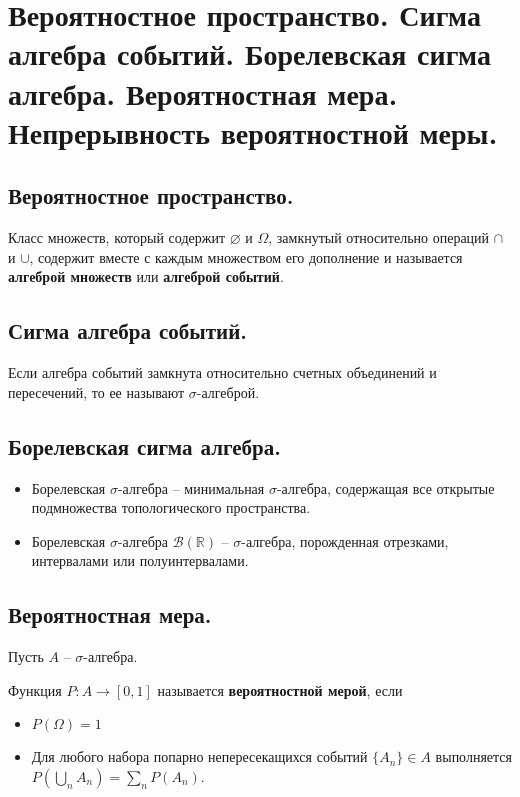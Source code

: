 \section{Вероятностное пространство. Сигма алгебра событий. Борелевская сигма алгебра. Вероятностная мера. Непрерывность вероятностной меры.}

\subsection{Вероятностное пространство.}

\begin{definition}
    Класс множеств, который содержит $\varnothing$ и $\Omega$, замкнутый относительно операций $\cap$ и $\cup$, содержит вместе с каждым множеством его дополнение и называется \textbf{алгеброй множеств} или \textbf{алгеброй событий}.
\end{definition}

\subsection{Сигма алгебра событий.}
\begin{definition}
    Если алгебра событий замкнута относительно счетных объединений и пересечений, то ее называют $\sigma$-алгеброй. 
\end{definition}

\subsection{Борелевская сигма алгебра.}
\begin{definition}
    \text{}
    \begin{itemize}
        \item Борелевская $\sigma$-алгебра -- минимальная $\sigma$-алгебра, содержащая все открытые подмножества топологического пространства.
        \item Борелевская $\sigma$-алгебра $\mathcal{B}(\mathbb{R})$  -- $\sigma$-алгебра, порожденная отрезками, интервалами или полуинтервалами.
    \end{itemize}
\end{definition}

\subsection{Вероятностная мера.}
Пусть $A$ -- $\sigma$-алгебра.
\begin{definition}
    Функция $P : A \to [0, 1]$ называется \textbf{вероятностной мерой}, если
    \begin{itemize}
        \item $P(\Omega) = 1$
        \item Для любого набора попарно непересекащихся событий $\{A_n\} \in A$ выполняется $P(\bigcup_n A_n) = \sum_n P(A_n)$.
    \end{itemize}
\end{definition}

